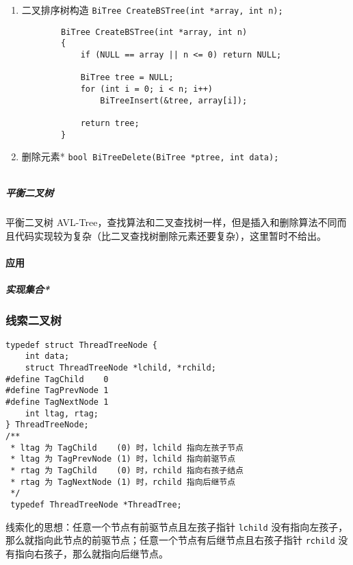 \documentclass{ctexart}
\begin{document}
\begin{enumerate}
    \item 二叉排序树构造 \texttt{BiTree CreateBSTree(int *array, int n);}
        \begin{verbatim}
        BiTree CreateBSTree(int *array, int n)
        {
            if (NULL == array || n <= 0) return NULL;

            BiTree tree = NULL;
            for (int i = 0; i < n; i++)
                BiTreeInsert(&tree, array[i]);

            return tree;
        }
        \end{verbatim}

    \item 删除元素* \texttt{bool BiTreeDelete(BiTree *ptree, int data);}
        \inputminted{c}{codes/bst-delete.c}

\end{enumerate}

\subparagraph{平衡二叉树} 平衡二叉树 AVL-Tree，查找算法和二叉查找树一样，但是插入和删除算法不同而且代码实现较为复杂（比二叉查找树删除元素还要复杂），这里暂时不给出。

\paragraph{应用}
\subparagraph{实现集合*}


\subsubsection{线索二叉树}
\begin{verbatim}
typedef struct ThreadTreeNode {
    int data;
    struct ThreadTreeNode *lchild, *rchild;
#define TagChild    0
#define TagPrevNode 1
#define TagNextNode 1
    int ltag, rtag;
} ThreadTreeNode;
/**
 * ltag 为 TagChild    (0) 时，lchild 指向左孩子节点
 * ltag 为 TagPrevNode (1) 时，lchild 指向前驱节点
 * rtag 为 TagChild    (0) 时，rchild 指向右孩子结点
 * rtag 为 TagNextNode (1) 时，rchild 指向后继节点
 */
 typedef ThreadTreeNode *ThreadTree;
\end{verbatim}
线索化的思想：任意一个节点有前驱节点且左孩子指针 \texttt{lchild} 没有指向左孩子，那么就指向此节点的前驱节点；任意一个节点有后继节点且右孩子指针 \texttt{rchild} 没有指向右孩子，那么就指向后继节点。
\end{document}
